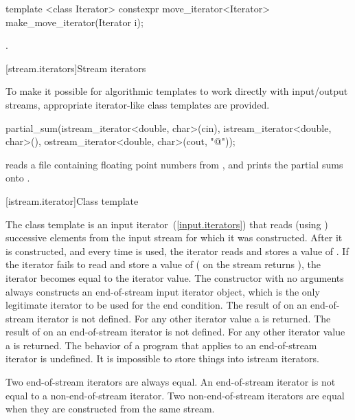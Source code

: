 %
\begin{itemdecl}
template <class Iterator>
constexpr move_iterator<Iterator> make_move_iterator(Iterator i);
\end{itemdecl}

\begin{itemdescr}
\pnum
\returns {}.
\end{itemdescr}

[stream.iterators]{Stream iterators}

\pnum
To make it possible for algorithmic templates to work directly with input/output streams, appropriate
iterator-like
class templates
are provided.

\enterexample
\begin{codeblock}
partial_sum(istream_iterator<double, char>(cin),
  istream_iterator<double, char>(),
  ostream_iterator<double, char>(cout, "@\textbackslash@n"));
\end{codeblock}

reads a file containing floating point numbers from
,
and prints the partial sums onto
.
\exitexample

[istream.iterator]{Class template }

\pnum
{}%
The class template
is an input iterator~(\ref{input.iterators}) that
reads (using
)
successive elements from the input stream for which it was constructed.
After it is constructed, and every time
\tcode{++}
is used, the iterator reads and stores a value of
.
If the iterator fails to read and store a value of 
(
on the stream returns
),
the iterator becomes equal to the
iterator value.
The constructor with no arguments
always constructs
an end-of-stream input iterator object, which is the only legitimate iterator to be used
for the end condition.
The result of
on an end-of-stream iterator is not defined.
For any other iterator value a
is returned.
The result of
on an end-of-stream iterator is not defined.
For any other iterator value a
is returned.
The behavior of a program that applies  to an end-of-stream
iterator is undefined.
It is impossible to store things into istream iterators.

\pnum
Two end-of-stream iterators are always equal.
An end-of-stream iterator is not
equal to a non-end-of-stream iterator.
Two non-end-of-stream iterators are equal when they are constructed from the same stream.

